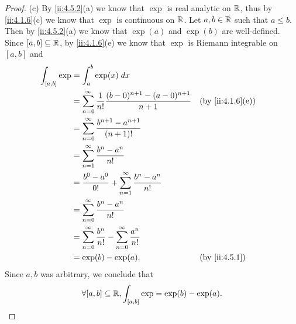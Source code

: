 \begin{proof}{(c)}
  By \cref{ii:4.5.2}(a) we know that \(\exp\) is real analytic on \(\mathbb{R}\), thus by \cref{ii:4.1.6}(c) we know that \(\exp\) is continuous on \(\mathbb{R}\).
  Let \(a, b \in \mathbb{R}\) such that \(a \leq b\).
  Then by \cref{ii:4.5.2}(a) we know that \(\exp(a)\) and \(\exp(b)\) are well-defined.
  Since \([a, b] \subseteq \mathbb{R}\), by \cref{ii:4.1.6}(e) we know that \(\exp\) is Riemann integrable on \([a, b]\) and
  \begin{align*}
    \int_{[a, b]} \exp & = \int_a^b \exp(x) \; dx                                                                                   \\
                       & = \sum_{n = 0}^\infty \dfrac{1}{n!} \dfrac{(b - 0)^{n + 1} - (a - 0)^{n + 1}}{n + 1} &  & \by{ii:4.1.6}[e] \\
                       & = \sum_{n = 0}^\infty \dfrac{b^{n + 1} - a^{n + 1}}{(n + 1)!}                                              \\
                       & = \sum_{n = 1}^\infty \dfrac{b^n - a^n}{n!}                                                                \\
                       & = \dfrac{b^0 - a^0}{0!} + \sum_{n = 1}^\infty \dfrac{b^n - a^n}{n!}                                        \\
                       & = \sum_{n = 0}^\infty \dfrac{b^n - a^n}{n!}                                                                \\
                       & = \sum_{n = 0}^\infty \dfrac{b^n}{n!} - \sum_{n = 0}^\infty \dfrac{a^n}{n!}                                \\
                       & = \exp(b) - \exp(a).                                                                 &  & \by{ii:4.5.1}
  \end{align*}
  Since \(a, b\) was arbitrary, we conclude that
  \[
    \forall [a, b] \subseteq \mathbb{R}, \int_{[a, b]} \exp = \exp(b) - \exp(a).
  \]
\end{proof}

